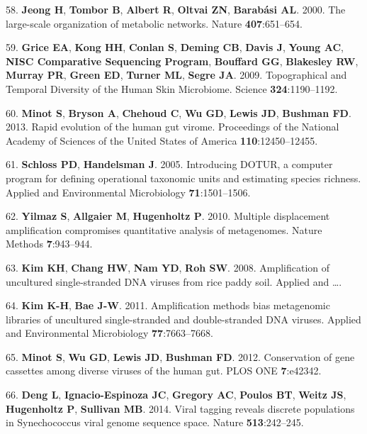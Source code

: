 \documentclass[12pt,]{article}
\begin{document}
\hypertarget{ref-Jeong:2000im}{}
58. \textbf{Jeong H}, \textbf{Tombor B}, \textbf{Albert R},
\textbf{Oltvai ZN}, \textbf{Barabási AL}. 2000. The large-scale
organization of metabolic networks. Nature \textbf{407}:651--654.

\hypertarget{ref-Grice:2009ee}{}
59. \textbf{Grice EA}, \textbf{Kong HH}, \textbf{Conlan S},
\textbf{Deming CB}, \textbf{Davis J}, \textbf{Young AC}, \textbf{NISC
Comparative Sequencing Program}, \textbf{Bouffard GG}, \textbf{Blakesley
RW}, \textbf{Murray PR}, \textbf{Green ED}, \textbf{Turner ML},
\textbf{Segre JA}. 2009. Topographical and Temporal Diversity of the
Human Skin Microbiome. Science \textbf{324}:1190--1192.

\hypertarget{ref-Minot:2013ih}{}
60. \textbf{Minot S}, \textbf{Bryson A}, \textbf{Chehoud C}, \textbf{Wu
GD}, \textbf{Lewis JD}, \textbf{Bushman FD}. 2013. Rapid evolution of
the human gut virome. Proceedings of the National Academy of Sciences of
the United States of America \textbf{110}:12450--12455.

\hypertarget{ref-Schloss:2005hz}{}
61. \textbf{Schloss PD}, \textbf{Handelsman J}. 2005. Introducing DOTUR,
a computer program for defining operational taxonomic units and
estimating species richness. Applied and Environmental Microbiology
\textbf{71}:1501--1506.

\hypertarget{ref-Yilmaz:2010jb}{}
62. \textbf{Yilmaz S}, \textbf{Allgaier M}, \textbf{Hugenholtz P}. 2010.
Multiple displacement amplification compromises quantitative analysis of
metagenomes. Nature Methods \textbf{7}:943--944.

\hypertarget{ref-Kim:2008to}{}
63. \textbf{Kim KH}, \textbf{Chang HW}, \textbf{Nam YD}, \textbf{Roh
SW}. 2008. Amplification of uncultured single-stranded DNA viruses from
rice paddy soil. Applied and \ldots{}.

\hypertarget{ref-Kim:2011hp}{}
64. \textbf{Kim K-H}, \textbf{Bae J-W}. 2011. Amplification methods bias
metagenomic libraries of uncultured single-stranded and double-stranded
DNA viruses. Applied and Environmental Microbiology
\textbf{77}:7663--7668.

\hypertarget{ref-Minot:2012ed}{}
65. \textbf{Minot S}, \textbf{Wu GD}, \textbf{Lewis JD}, \textbf{Bushman
FD}. 2012. Conservation of gene cassettes among diverse viruses of the
human gut. PLOS ONE \textbf{7}:e42342.

\hypertarget{ref-Deng:2014eb}{}
66. \textbf{Deng L}, \textbf{Ignacio-Espinoza JC}, \textbf{Gregory AC},
\textbf{Poulos BT}, \textbf{Weitz JS}, \textbf{Hugenholtz P},
\textbf{Sullivan MB}. 2014. Viral tagging reveals discrete populations
in Synechococcus viral genome sequence space. Nature
\textbf{513}:242--245.
\end{document}
